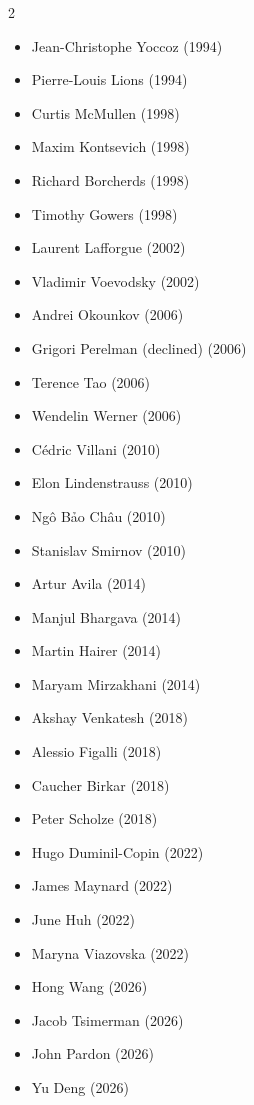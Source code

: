 \documentclass[12pt,a4paper]{book}
\theoremstyle{definition}
\theoremstyle{remark}
\begin{document}
\begin{multicols}{2}
\begin{itemize}
\item Jean-Christophe Yoccoz (1994)
\item Pierre-Louis Lions (1994)
\item Curtis McMullen (1998)
\item Maxim Kontsevich (1998)
\item Richard Borcherds (1998)
\item Timothy Gowers (1998)
\item Laurent Lafforgue (2002)
\item Vladimir Voevodsky (2002)
\item Andrei Okounkov (2006)
\item Grigori Perelman (declined) (2006)
\item Terence Tao (2006)
\item Wendelin Werner (2006)
\item Cédric Villani (2010)
\item Elon Lindenstrauss (2010)
\item Ngô Bảo Châu (2010)
\item Stanislav Smirnov (2010)
\item Artur Avila (2014)
\item Manjul Bhargava (2014)
\item Martin Hairer (2014)
\item Maryam Mirzakhani (2014)
\item Akshay Venkatesh (2018)
\item Alessio Figalli (2018)
\item Caucher Birkar (2018)
\item Peter Scholze (2018)
\item Hugo Duminil-Copin (2022)
\item James Maynard (2022)
\item June Huh (2022)
\item Maryna Viazovska (2022)
\item Hong Wang (2026)
\item Jacob Tsimerman (2026)
\item John Pardon (2026)
\item Yu Deng (2026)
\end{itemize}
\end{multicols}
\end{document}
